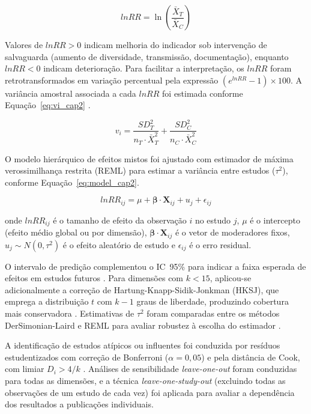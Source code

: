 \begin{equation}
lnRR = \ln\left(\frac{\bar{X}_{T}}{\bar{X}_{C}}\right)
\label{eq:lnrr_cap2}
\end{equation}

\noindent Valores de $lnRR > 0$ indicam melhoria do indicador sob intervenção de salvaguarda (aumento de diversidade, transmissão, documentação), enquanto $lnRR < 0$ indicam deterioração. Para facilitar a interpretação, os $lnRR$ foram retrotransformados em variação percentual pela expressão $(e^{lnRR} - 1) \times 100$. A variância amostral associada a cada $lnRR$ foi estimada conforme Equação~\ref{eq:vi_cap2} \cite{Hedges1999}.

\begin{equation}
v_i = \frac{SD_T^2}{n_T \cdot \bar{X}_T^2} + \frac{SD_C^2}{n_C \cdot \bar{X}_C^2}
\label{eq:vi_cap2}
\end{equation}

O modelo hierárquico de efeitos mistos foi ajustado com estimador de máxima verossimilhança restrita (REML) para estimar a variância entre estudos ($\tau^2$), conforme Equação~\ref{eq:model_cap2}.

\begin{equation}
lnRR_{ij} = \mu + \boldsymbol{\beta} \cdot \mathbf{X}_{ij} + u_j + \epsilon_{ij}
\label{eq:model_cap2}
\end{equation}

\noindent onde $lnRR_{ij}$ é o tamanho de efeito da observação $i$ no estudo $j$, $\mu$ é o intercepto (efeito médio global ou por dimensão), $\boldsymbol{\beta} \cdot \mathbf{X}_{ij}$ é o vetor de moderadores fixos, $u_j \sim N(0, \tau^2)$ é o efeito aleatório de estudo e $\epsilon_{ij}$ é o erro residual.

O intervalo de predição complementou o IC~95\% para indicar a faixa esperada de efeitos em estudos futuros \cite{IntHout2016}. Para dimensões com $k < 15$, aplicou-se adicionalmente a correção de Hartung-Knapp-Sidik-Jonkman (HKSJ), que emprega a distribuição $t$ com $k-1$ graus de liberdade, produzindo cobertura mais conservadora \cite{Higgins2019}. Estimativas de $\tau^2$ foram comparadas entre os métodos DerSimonian-Laird e REML para avaliar robustez à escolha do estimador \cite{Borenstein2009}.

A identificação de estudos atípicos ou influentes foi conduzida por resíduos estudentizados com correção de Bonferroni ($\alpha = 0{,}05$) e pela distância de Cook, com limiar $D_i > 4/k$ \cite{Viechtbauer2010}. Análises de sensibilidade \textit{leave-one-out} foram conduzidas para todas as dimensões, e a técnica \textit{leave-one-study-out} (excluindo todas as observações de um estudo de cada vez) foi aplicada para avaliar a dependência dos resultados a publicações individuais.

